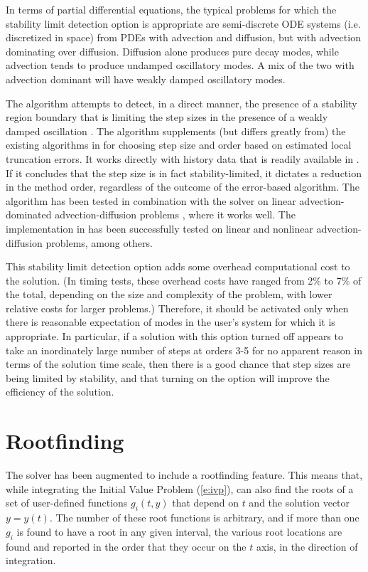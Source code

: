 In terms of partial differential equations, the typical problems for
which the stability limit detection option is appropriate are
semi-discrete ODE systems (i.e. discretized in space) from PDEs with
advection and diffusion, but with advection dominating over diffusion.
Diffusion alone produces pure decay modes, while advection tends to
produce undamped oscillatory modes.  A mix of the two with advection
dominant will have weakly damped oscillatory modes.

The {\stald} algorithm attempts to detect, in a direct
manner, the presence of a stability region boundary that is limiting
the step sizes in the presence of a weakly damped oscillation \cite{Hin:92}.
The algorithm supplements (but differs greatly from) the existing
algorithms in {\cvode} for choosing step size and order based on
estimated local truncation errors.  It works directly
with history data that is readily available in {\cvode}.  If it concludes
that the step size is in fact stability-limited, it dictates a
reduction in the method order, regardless of the outcome of the
error-based algorithm.  The {\stald} algorithm has been tested in
combination with the {\vode} solver on linear advection-dominated
advection-diffusion problems \cite{Hin:95}, where it works well.  The
implementation in {\cvode} has been successfully tested on linear 
and nonlinear advection-diffusion problems, among others.

This stability limit detection option adds some overhead computational
cost to the {\cvode} solution.  (In timing tests, these overhead costs
have ranged from 2\% to 7\% of the total, depending on the size and
complexity of the problem, with lower relative costs for larger
problems.)  Therefore, it should be activated only when there is
reasonable expectation of modes in the user's system for which it is
appropriate.  In particular, if a {\cvode} solution with this option
turned off appears to take an inordinately large number of steps at
orders 3-5 for no apparent reason in terms of the solution time scale,
then there is a good chance that step sizes are being limited by
stability, and that turning on the option will improve the efficiency
of the solution. 


\section{Rootfinding}\label{ss:rootfinding}

The {\cvode} solver has been augmented to include a rootfinding
feature.  This means that, while integrating the Initial Value Problem
(\ref{e:ivp}), {\cvode} can also find the roots of a set of user-defined
functions $g_i(t,y)$ that depend on $t$ and the solution vector 
$y = y(t)$.  The number of these root functions is arbitrary, and if
more than one $g_i$ is found to have a root in any given interval, the
various root locations are found and reported in the order that they
occur on the $t$ axis, in the direction of integration.

